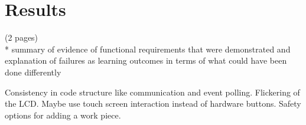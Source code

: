 \chapter{Results}

(2 pages)\\
* summary of evidence of functional requirements that were demonstrated and explanation of failures as learning outcomes in terms of what could have been done differently

Consistency in code structure like communication and event polling.
Flickering of the LCD.
Maybe use touch screen interaction instead of hardware buttons.
Safety options for adding a work piece.


